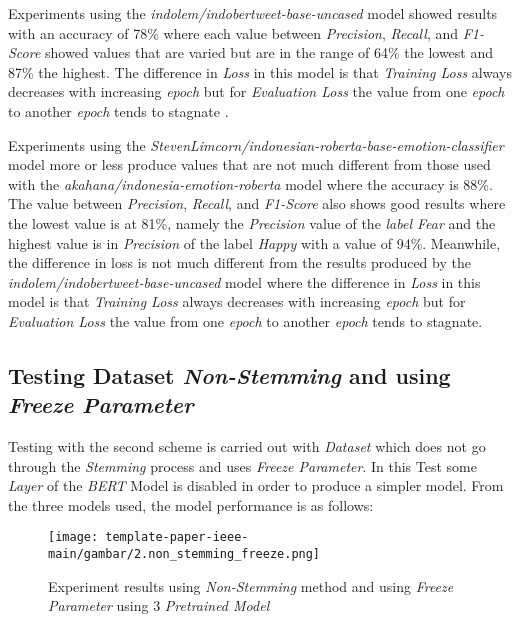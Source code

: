 Experiments using the \textit{indolem/indobertweet-base-uncased} model showed results with an accuracy of 78\% where each value between \textit{Precision}, \textit{Recall}, and \textit{F1-Score} showed values that are varied but are in the range of 64\% the lowest and 87\% the highest. The difference in \textit{Loss} in this model is that \textit{Training Loss} always decreases with increasing \textit{epoch} but for \textit{Evaluation Loss} the value from one \textit{epoch} to another \textit{epoch} tends to stagnate .

Experiments using the \textit{StevenLimcorn/indonesian-roberta-base-emotion-classifier} model more or less produce values that are not much different from those used with the \textit{akahana/indonesia-emotion-roberta} model where the accuracy is 88\%. The value between \textit{Precision}, \textit{Recall}, and \textit{F1-Score} also shows good results where the lowest value is at 81\%, namely the \textit{Precision} value of the \textit{ label Fear} and the highest value is in \textit{Precision} of the label \textit{Happy} with a value of 94\%. Meanwhile, the difference in loss is not much different from the results produced by the \textit{indolem/indobertweet-base-uncased} model where the difference in \textit{Loss} in this model is that \textit{Training Loss} always decreases with increasing \textit{epoch } but for \textit{Evaluation Loss} the value from one \textit{epoch} to another \textit{epoch} tends to stagnate.

\subsection{Testing Dataset \textit{Non-Stemming} and using \textit{Freeze Parameter}}

Testing with the second scheme is carried out with \textit{Dataset} which does not go through the \textit{Stemming} process and uses \textit{Freeze Parameter}. In this Test some \textit{Layer} of the \textit{BERT} Model is disabled in order to produce a simpler model. From the three models used, the model performance is as follows:

\begin{figure}[h]
    \begin{center}
        \texttt{[image: template-paper-ieee-main/gambar/2.non\_stemming\_freeze.png]}
        \caption{Experiment results using \textit{Non-Stemming} method and using \textit{Freeze Parameter} using 3 \textit{Pretrained Model}}
        \label{fig: bertToken}
    \end{center}
\end{figure}

